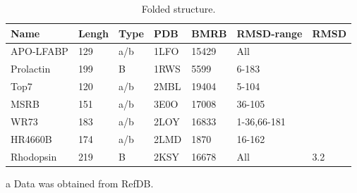 \begin{table}[h]
    \caption{Folded structure.}
    \begin{center}
    \begin{threeparttable}
    \begin{tabular}{l l l l l l l}
Name                & Lengh    & Type   & PDB     & BMRB    & RMSD-range    &  RMSD  \\\hline
APO-LFABP           & 129      & a/b    & 1LFO    & 15429\tnote{a}  & All        &   \\
Prolactin           & 199      & B      & 1RWS    & 5599      & 6-183            &   \\
Top7                & 120      & a/b    & 2MBL    & 19404     & 5-104            &   \\
MSRB                & 151      & a/b    & 3E0O    & 17008     & 36-105           &   \\
WR73                & 183      & a/b    & 2LOY    & 16833     & 1-36,66-181      &   \\
HR4660B             & 174      & a/b    & 2LMD    & 1870      & 16-162           &   \\
Rhodopsin           & 219      & B      & 2KSY    & 16678     & All              & 3.2
    \end{tabular}
    \begin{tablenotes}
    \item[a] Data was obtained from RefDB.
    \end{tablenotes}
    \end{threeparttable}
    \end{center}
    \label{tab:folding_large}
\end{table}





